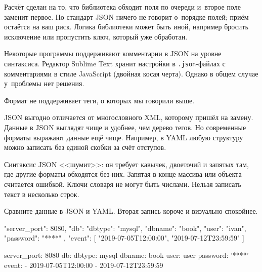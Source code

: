 Расчёт сделан на то, что библиотека обходит поля по очереди и~второе поле
заменит первое. Но стандарт JSON ничего не говорит о~порядке полей; приём
остаётся на ваш риск. Логика библиотеки может быть иной, например бросить
исключение или пропустить ключ, который уже обработан.

Некоторые программы поддерживают комментарии в JSON на уровне синтаксиса.
Редактор Sublime Text хранит настройки в \verb|.json|-файлах с комментариями в
стиле JavaScript (двойная косая черта).  Однако в общем случае у~проблемы нет
решения.


Формат не поддерживает теги, о которых мы говорили выше.

JSON выгодно отличается от многословного XML, которому пришёл на замену. Данные
в JSON выглядят чище и удобнее, чем дерево тегов. Но современные форматы
выражают данные ещё чище. Например, в YAML любую структуру можно записать без
единой скобки за счёт отступов.

Синтаксис JSON <<шумит>>: он требует кавычек, двоеточий и запятых там, где
другие форматы обходятся без них. Запятая в конце массива или объекта считается
ошибкой. Ключи словаря не могут быть числами. Нельзя записать текст в несколько
строк.

Сравните данные в JSON и YAML. Вторая запись короче и визуально
спокойнее\iflarge{}\fi.

\ifnarrow

\begin{english}
  \begin{json}
{
    "server_port": 8080,
    "db": {
        "dbtype":   "mysql",
        "dbname":   "book",
        "user":     "ivan",
        "password": "****"
    },
    "event": [
        "2019-07-05T12:00:00",
        "2019-07-12T23:59:59"
    ]
}
  \end{json}

\splitter

  \begin{yaml}
server_port: 8080
db:
  dbtype:   mysql
  dbname:   book
  user:     user
  password: '****'
event:
  - 2019-07-05T12:00:00
  - 2019-07-12T23:59:59
  \end{yaml}
\end{english}

\else


